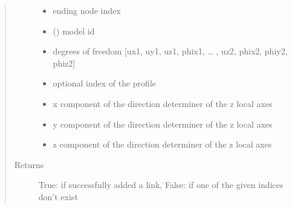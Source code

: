 \documentclass[letterpaper,10pt,english]{sphinxmanual}
\begin{document}
\begin{fulllineitems}
\begin{fulllineitems}
\begin{quote}
\begin{description}
\begin{itemize}
\item {} 
 \textendash{} ending node index

\item {} 
 () \textendash{} model id

\item {} 
 \textendash{} degrees of freedom {[}ux1, uy1, uz1, phix1, … , uz2, phix2, phiy2, phiz2{]}

\item {} 
 \textendash{} optional index of the profile

\item {} 
 \textendash{} x component of the direction determiner of the z local axes

\item {} 
 \textendash{} y component of the direction determiner of the z local axes

\item {} 
 \textendash{} z component of the direction determiner of the z local axes

\end{itemize}

\item[{Returns}] \leavevmode
True: if successfully added a link, False: if one of the given indices don’t exist

\end{description}\end{quote}

\end{fulllineitems}



\end{fulllineitems}
\end{document}
